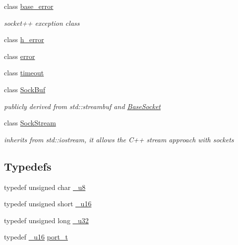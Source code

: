 \begin{CompactItemize}
class \hyperlink{classsocketpp_1_1base__error}{base\_\-error}
\begin{CompactList}\small\item\em socket++ exception class \item\end{CompactList}\item 
class \hyperlink{classsocketpp_1_1h__error}{h\_\-error}
\item 
class \hyperlink{classsocketpp_1_1error}{error}
\item 
class \hyperlink{classsocketpp_1_1timeout}{timeout}
\item 
class \hyperlink{classsocketpp_1_1SockBuf}{SockBuf}
\begin{CompactList}\small\item\em publicly derived from std::streambuf and \hyperlink{classsocketpp_1_1BaseSocket}{BaseSocket} \item\end{CompactList}\item 
class \hyperlink{classsocketpp_1_1SockStream}{SockStream}
\begin{CompactList}\small\item\em inherits from std::iostream, it allows the C++ stream approach with sockets \item\end{CompactList}\end{CompactItemize}
\subsection*{Typedefs}
\begin{CompactItemize}
\item 
typedef unsigned char \hyperlink{namespacesocketpp_1398da7d8125cdb32e89041e5b0adb96}{\_\-u8}
\item 
typedef unsigned short \hyperlink{namespacesocketpp_0d48e817f00cbb84d07faec41ee4b169}{\_\-u16}
\item 
typedef unsigned long \hyperlink{namespacesocketpp_d9c3b2ad093bb5814af59760e0a2192a}{\_\-u32}
\item 
typedef \hyperlink{namespacesocketpp_0d48e817f00cbb84d07faec41ee4b169}{\_\-u16} \hyperlink{namespacesocketpp_5517ef80f249b891a2ba64b95fc1e723}{port\_\-t}
\end{CompactItemize}
